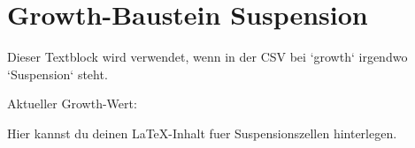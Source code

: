 \section*{Growth-Baustein Suspension}

Dieser Textblock wird verwendet, wenn in der CSV bei `growth` irgendwo `Suspension` steht.

Aktueller Growth-Wert:

\textbf{\Growth}

Hier kannst du deinen LaTeX-Inhalt fuer Suspensionszellen hinterlegen.
